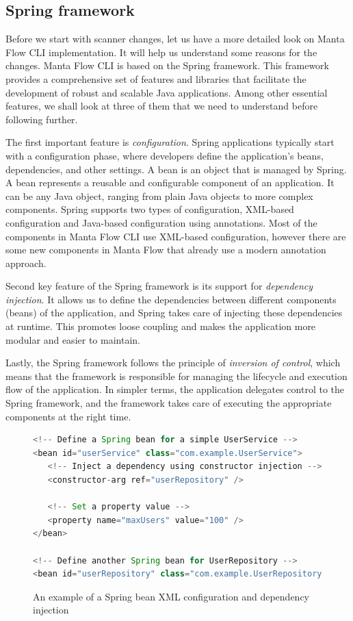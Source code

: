 \subsection{Spring framework}
Before we start with scanner changes, let us have a more detailed look on Manta Flow CLI implementation. It will help us understand some reasons for the changes. Manta Flow CLI is based on the Spring framework. This framework provides a comprehensive set of features and libraries that facilitate the development of robust and scalable Java applications. Among other essential features, we shall look at three of them that we need to understand before following further.
\par
The first important feature is \textit{configuration}. Spring applications typically start with a configuration phase, where developers define the application's beans, dependencies, and other settings. A bean is an object that is managed by Spring. A bean represents a reusable and configurable component of an application. It can be any Java object, ranging from plain Java objects to more complex components. Spring supports two types of configuration, XML-based configuration and Java-based configuration using annotations. Most of the components in Manta Flow CLI use XML-based configuration, however there are some new components in Manta Flow that already use a modern annotation approach.
\par
Second key feature of the Spring framework is its support for \textit{dependency injection}. It allows us to define the dependencies between different components (beans) of the application, and Spring takes care of injecting these dependencies at runtime. This promotes loose coupling and makes the application more modular and easier to maintain.
\par
Lastly, the Spring framework follows the principle of \textit{inversion of control}, which means that the framework is responsible for managing the lifecycle and execution flow of the application. In simpler terms, the application delegates control to the Spring framework, and the framework takes care of executing the appropriate components at the right time.
\begin{figure}[ht]
\begin{lstlisting}[language=Java]
<!-- Define a Spring bean for a simple UserService -->
<bean id="userService" class="com.example.UserService">
   <!-- Inject a dependency using constructor injection -->
   <constructor-arg ref="userRepository" />

   <!-- Set a property value -->
   <property name="maxUsers" value="100" />
</bean>

<!-- Define another Spring bean for UserRepository -->
<bean id="userRepository" class="com.example.UserRepository" />
\end{lstlisting}
\caption{An example of a Spring bean XML configuration and dependency injection}
\label{fig:bean}
\end{figure}
